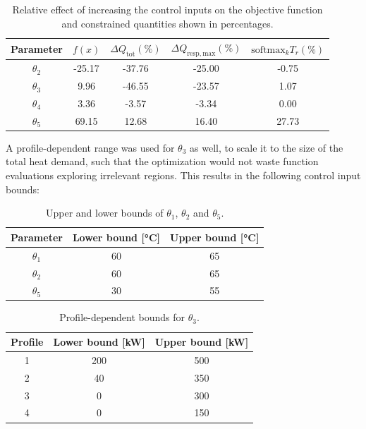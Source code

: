 \begin{table}[h!]
\centering
\caption{Relative effect of increasing the control inputs on the objective function and constrained quantities shown in percentages.}
\label{tab:physical_bounds}
\begin{tabular}{ccccc}
\hline
\textbf{Parameter} & $f(x)$ & $\Delta Q_{\mathrm{tot}} (\%)$ & $\Delta Q_{\mathrm{resp,max}} (\%)$ & $\mathrm{softmax}_k T_r (\%)$ \\
\hline
$\theta_2$ & -25.17 & -37.76 & -25.00 & -0.75 \\
$\theta_3$ & 9.96 & -46.55 & -23.57 & 1.07 \\
$\theta_4$ & 3.36 & -3.57 & -3.34 & 0.00 \\
$\theta_5$ & 69.15 & 12.68 & 16.40 & 27.73 \\
\hline
\end{tabular}
\end{table}

A profile-dependent range was used for $\theta_3$ as well, to scale it to the size of the total heat demand, such that the optimization would not waste function evaluations exploring irrelevant regions. This results in the following control input bounds:

\begin{table}[h!]
\centering
\caption{Upper and lower bounds of $\theta_1$, $\theta_2$ and $\theta_5$.}
\label{tab:physical_bounds}
\begin{tabular}{ccc}
\hline
\textbf{Parameter} & \textbf{Lower bound} [°C]& \textbf{Upper bound} [°C] \\
\hline
$\theta_1$  & 60 & 65 \\
$\theta_2$  & 60 & 65 \\
$\theta_5$  & 30 & 55 \\
\hline
\end{tabular}
\end{table}
 
 
\begin{table}[h!]
\centering
\caption{Profile-dependent bounds for $\theta_3$.}
\label{tab:input_constraints}
\begin{tabular}{ccc}
\hline
\textbf{Profile} & \textbf{Lower bound} [kW] & \textbf{Upper bound} [kW] \\
\hline
1 & 200 & 500 \\
2 & 40 & 350 \\
3 & 0 & 300 \\
4 & 0 & 150 \\
\hline
\end{tabular}
\end{table}


